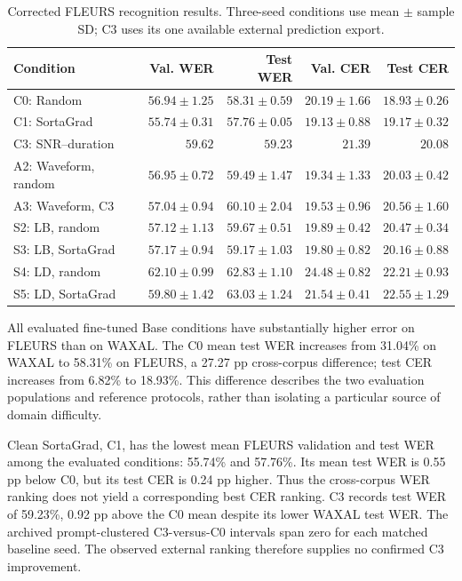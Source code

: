 \documentclass[12pt,a4paper]{report}
\begin{document}
\begin{table}[htbp]\centering\scriptsize
\caption{Corrected FLEURS recognition results. Three-seed conditions use mean $\pm$ sample SD; C3 uses its one available external prediction export.}\label{tab:results-fleurs}
\setlength{\tabcolsep}{4pt}
\begin{tabular}{lrrrr}\toprule
Condition & Val. WER & Test WER & Val. CER & Test CER\\\midrule
C0: Random & $56.94 \pm 1.25$ & $58.31 \pm 0.59$ & $20.19 \pm 1.66$ & $18.93 \pm 0.26$ \\
C1: SortaGrad & $55.74 \pm 0.31$ & $57.76 \pm 0.05$ & $19.13 \pm 0.88$ & $19.17 \pm 0.32$ \\
C3: SNR--duration & $59.62$ & $59.23$ & $21.39$ & $20.08$ \\
A2: Waveform, random & $56.95 \pm 0.72$ & $59.49 \pm 1.47$ & $19.34 \pm 1.33$ & $20.03 \pm 0.42$ \\
A3: Waveform, C3 & $57.04 \pm 0.94$ & $60.10 \pm 2.04$ & $19.53 \pm 0.96$ & $20.56 \pm 1.60$ \\
S2: LB, random & $57.12 \pm 1.13$ & $59.67 \pm 0.51$ & $19.89 \pm 0.42$ & $20.47 \pm 0.34$ \\
S3: LB, SortaGrad & $57.17 \pm 0.94$ & $59.17 \pm 1.03$ & $19.80 \pm 0.82$ & $20.16 \pm 0.88$ \\
S4: LD, random & $62.10 \pm 0.99$ & $62.83 \pm 1.10$ & $24.48 \pm 0.82$ & $22.21 \pm 0.93$ \\
S5: LD, SortaGrad & $59.80 \pm 1.42$ & $63.03 \pm 1.24$ & $21.54 \pm 0.41$ & $22.55 \pm 1.29$ \\
\bottomrule\end{tabular}\end{table}

All evaluated fine-tuned Base conditions have substantially higher error on FLEURS than on WAXAL. The C0 mean test WER increases from 31.04\% on WAXAL to 58.31\% on FLEURS, a 27.27 pp cross-corpus difference; test CER increases from 6.82\% to 18.93\%. This difference describes the two evaluation populations and reference protocols, rather than isolating a particular source of domain difficulty.

Clean SortaGrad, C1, has the lowest mean FLEURS validation and test WER among the evaluated conditions: 55.74\% and 57.76\%. Its mean test WER is 0.55 pp below C0, but its test CER is 0.24 pp higher. Thus the cross-corpus WER ranking does not yield a corresponding best CER ranking. C3 records test WER of 59.23\%, 0.92 pp above the C0 mean despite its lower WAXAL test WER. The archived prompt-clustered C3-versus-C0 intervals span zero for each matched baseline seed. The observed external ranking therefore supplies no confirmed C3 improvement.
\end{document}
